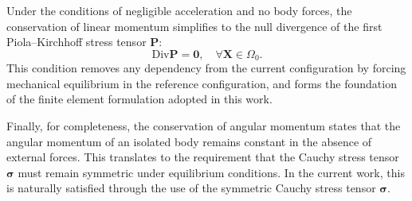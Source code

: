 \documentclass[a4paper,11pt]{article}
\begin{document}
Under the conditions of negligible acceleration and no body forces, the conservation of linear momentum simplifies to the null divergence of the first Piola–Kirchhoff stress tensor $\mathbf{P}$:
\begin{equation}
\text{Div} \mathbf{P} = \mathbf{0}, \quad \forall \mathbf{X} \in \Omega_0.
\end{equation}
This condition removes any dependency from the current configuration by forcing mechanical equilibrium in the reference configuration, and forms the foundation of the finite element formulation adopted in this work.

Finally, for completeness, the conservation of angular momentum states that the angular momentum of an isolated body remains constant in the absence of external forces. This translates to the requirement that the Cauchy stress tensor $\boldsymbol{\sigma}$ must remain symmetric under equilibrium conditions. In the current work, this is naturally satisfied through the use of the symmetric Cauchy stress tensor $\boldsymbol{\sigma}$.



\end{document}
